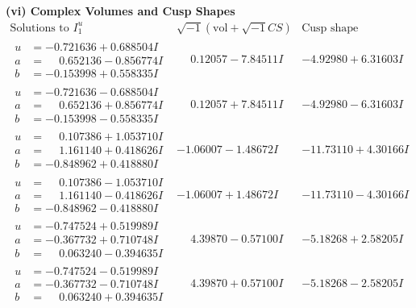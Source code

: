 \documentclass[1p]{elsarticle_modified}
\theoremstyle{definition}
\newcommand{\I}{\sqrt{-1}}
\begin{document}
\newpage\flushleft \textbf{(vi) Complex Volumes and Cusp Shapes}
$$\begin{array}{c|c|c}  
\text{Solutions to }I^u_{1}& \I (\text{vol} + \sqrt{-1}CS) & \text{Cusp shape}\\
 \hline 
\begin{aligned}
u &= -0.721636 + 0.688504 I \\
a &= \phantom{-}0.652136 - 0.856774 I \\
b &= -0.153998 + 0.558335 I\end{aligned}
 & \phantom{-}0.12057 - 7.84511 I & -4.92980 + 6.31603 I \\ \hline\begin{aligned}
u &= -0.721636 - 0.688504 I \\
a &= \phantom{-}0.652136 + 0.856774 I \\
b &= -0.153998 - 0.558335 I\end{aligned}
 & \phantom{-}0.12057 + 7.84511 I & -4.92980 - 6.31603 I \\ \hline\begin{aligned}
u &= \phantom{-}0.107386 + 1.053710 I \\
a &= \phantom{-}1.161140 + 0.418626 I \\
b &= -0.848962 + 0.418880 I\end{aligned}
 & -1.06007 - 1.48672 I & -11.73110 + 4.30166 I \\ \hline\begin{aligned}
u &= \phantom{-}0.107386 - 1.053710 I \\
a &= \phantom{-}1.161140 - 0.418626 I \\
b &= -0.848962 - 0.418880 I\end{aligned}
 & -1.06007 + 1.48672 I & -11.73110 - 4.30166 I \\ \hline\begin{aligned}
u &= -0.747524 + 0.519989 I \\
a &= -0.367732 + 0.710748 I \\
b &= \phantom{-}0.063240 - 0.394635 I\end{aligned}
 & \phantom{-}4.39870 - 0.57100 I & -5.18268 + 2.58205 I \\ \hline\begin{aligned}
u &= -0.747524 - 0.519989 I \\
a &= -0.367732 - 0.710748 I \\
b &= \phantom{-}0.063240 + 0.394635 I\end{aligned}
 & \phantom{-}4.39870 + 0.57100 I & -5.18268 - 2.58205 I \\ \hline\begin{aligned}

\end{aligned}
\end{array}$$
\end{document}
